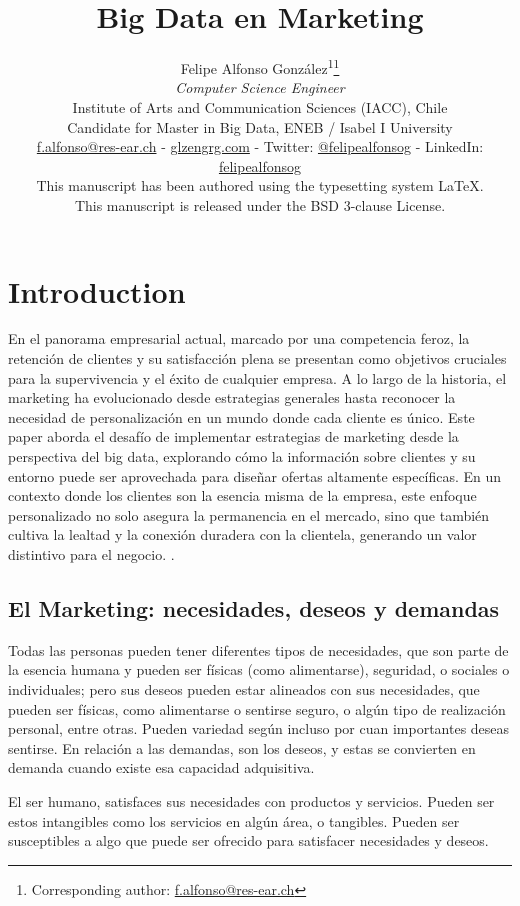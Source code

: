 \documentclass[
    a4paper, %
    10pt, %
    unnumberedsections, %
    twoside, %
]{LTJournalArticle}
\title{Big Data en Marketing}
\author{%
    Felipe Alfonso González\textsuperscript{1}\thanks{Corresponding author: \href{mailto:f.alfonso@res-ear.ch}{f.alfonso@res-ear.ch}}\\
    \textit{ Computer Science Engineer}\\
    \footnotesize Institute of Arts and Communication Sciences (IACC), Chile\\[-6pt]
    \footnotesize Candidate for Master in Big Data, ENEB / Isabel I University\\[-6pt]
    \footnotesize\href{mailto:f.alfonso@res-ear.ch}{f.alfonso@res-ear.ch} - 
    \href{https://glzengrg.com}{glzengrg.com} - 
    Twitter: \href{https://twitter.com/felipealfonsog}{@felipealfonsog} - 
    LinkedIn: \href{https://linkedin.com/in/felipealfonsog}{felipealfonsog}\\
    \scriptsize This manuscript has been authored using the typesetting system \LaTeX{}. \\[-6pt]
    \scriptsize This manuscript is released under the BSD 3-clause License. \\
}
\begin{document}
\maketitle %


\section{Introduction}

En el panorama empresarial actual, marcado por una competencia feroz, la retención de clientes y su satisfacción plena se presentan como objetivos cruciales para la supervivencia y el éxito de cualquier empresa. A lo largo de la historia, el marketing ha evolucionado desde estrategias generales hasta reconocer la necesidad de personalización en un mundo donde cada cliente es único. Este paper aborda el desafío de implementar estrategias de marketing desde la perspectiva del big data, explorando cómo la información sobre clientes y su entorno puede ser aprovechada para diseñar ofertas altamente específicas. En un contexto donde los clientes son la esencia misma de la empresa, este enfoque personalizado no solo asegura la permanencia en el mercado, sino que también cultiva la lealtad y la conexión duradera con la clientela, generando un valor distintivo para el negocio. \cite{ENEB2023}.

\subsection{El Marketing: necesidades, deseos y demandas}

Todas las personas pueden tener diferentes tipos de necesidades, que son parte de la esencia humana y pueden ser físicas (como alimentarse), seguridad, o sociales o individuales; pero sus deseos pueden estar alineados con sus necesidades, que pueden ser físicas, como alimentarse o sentirse seguro, o algún tipo de realización personal, entre otras. Pueden variedad según incluso por cuan importantes deseas sentirse. En relación a las demandas, son los deseos, y estas se convierten en demanda cuando existe esa capacidad adquisitiva. 

El ser humano, satisfaces sus necesidades con productos y servicios. Pueden ser estos intangibles como los servicios en algún área, o tangibles. Pueden ser susceptibles a algo que puede ser ofrecido para satisfacer necesidades y deseos. 
\end{document}
